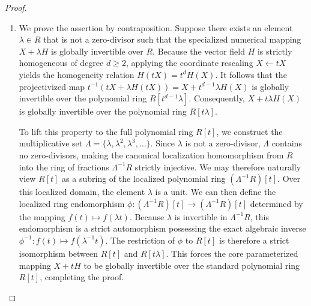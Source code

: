 \documentclass[11pt,a4paper]{article}
\begin{document}
\begin{proof}
\begin{enumerate}
    According to the formal inversion criterion for polynomial automorphisms, the formal power series inverse of $\Phi(X, t)$ must contain at least one non-vanishing higher-order term whose total degree strictly exceeds the standard geometric bound $d^{n-1}$, where $d = \max_i(\deg \Phi_i)$. The coefficient of this higher-order term can be isolated as a non-zero polynomial $f(t) \in R[t]$. Since $R$ respects the functional identity property where the zero polynomial is the unique representative of the zero function, there must exist a scalar value $\lambda \in R$ such that $f(\lambda) \neq 0$. This implies that the formal power series inverse of the specialized mapping $\Phi(X, \lambda)$ retains a non-vanishing term beyond the geometric degree bound, proving that $X + \lambda H$ is not globally invertible over $R$. Furthermore, since the modified polynomial $(t - \lambda)f(t) \in R[t]$ is non-zero, there must exist a distinct scalar value $\lambda' \neq \lambda$ such that $f(\lambda') \neq 0$, generating a distinct non-invertible specialized map. Repeating this construction inductively establishes the existence of infinitely many non-invertible scalar specializations over $R$.
    
        \item We prove the assertion by contraposition. Suppose there exists an element $\lambda \in R$ that is not a zero-divisor such that the specialized numerical mapping $X + \lambda H$ is globally invertible over $R$. Because the vector field $H$ is strictly homogeneous of degree $d \ge 2$, applying the coordinate rescaling $X \leftarrow tX$ yields the homogeneity relation $H(tX) = t^d H(X)$. It follows that the projectivized map $t^{-1}(tX + \lambda H(tX)) = X + t^{d-1}\lambda H(X)$ is globally invertible over the polynomial ring $R[t^{d-1}\lambda]$. Consequently, $X + t\lambda H(X)$ is globally invertible over the polynomial ring $R[t\lambda]$.
    
    To lift this property to the full polynomial ring $R[t]$, we construct the multiplicative set $\Lambda = \{\lambda, \lambda^2, \lambda^3, \dots\}$. Since $\lambda$ is not a zero-divisor, $\Lambda$ contains no zero-divisors, making the canonical localization homomorphism from $R$ into the ring of fractions $\Lambda^{-1}R$ strictly injective. We may therefore naturally view $R[t]$ as a subring of the localized polynomial ring $(\Lambda^{-1}R)[t]$. Over this localized domain, the element $\lambda$ is a unit. We can then define the localized ring endomorphism $\phi: (\Lambda^{-1}R)[t] \to (\Lambda^{-1}R)[t]$ determined by the mapping $f(t) \mapsto f(\lambda t)$. Because $\lambda$ is invertible in $\Lambda^{-1}R$, this endomorphism is a strict automorphism possessing the exact algebraic inverse $\phi^{-1}: f(t) \mapsto f(\lambda^{-1} t)$. The restriction of $\phi$ to $R[t]$ is therefore a strict isomorphism between $R[t]$ and $R[t\lambda]$. This forces the core parameterized mapping $X + tH$ to be globally invertible over the standard polynomial ring $R[t]$, completing the proof. \qedhere
    
\end{enumerate}
\end{proof}
\end{document}
